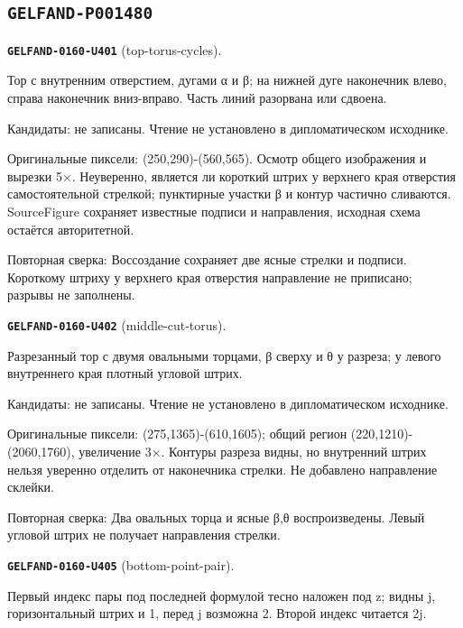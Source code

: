 \subsection*{\texttt{GELFAND-P001480}}
\par\noindent\leavevmode{}\label{GELFAND-0160-U401}\label{GELFAND-P001480:top-torus-cycles}\textbf{\texttt{GELFAND-0160-U401}} (top-torus-cycles).\nopagebreak[4]\par
Тор с внутренним отверстием, дугами α и β; на нижней дуге наконечник влево, справа наконечник вниз-вправо. Часть линий разорвана или сдвоена.\par
Кандидаты: не записаны. Чтение не установлено в дипломатическом исходнике.\par
Оригинальные пиксели: (250,290)-(560,565). Осмотр общего изображения и вырезки 5×. Неуверенно, является ли короткий штрих у верхнего края отверстия самостоятельной стрелкой; пунктирные участки β и контур частично сливаются. SourceFigure сохраняет известные подписи и направления, исходная схема остаётся авторитетной.\par
Повторная сверка: Воссоздание сохраняет две ясные стрелки и подписи. Короткому штриху у верхнего края отверстия направление не приписано; разрывы не заполнены.\par\medskip
\par\noindent\leavevmode{}\label{GELFAND-0160-U402}\label{GELFAND-P001480:middle-cut-torus}\textbf{\texttt{GELFAND-0160-U402}} (middle-cut-torus).\nopagebreak[4]\par
Разрезанный тор с двумя овальными торцами, β сверху и θ у разреза; у левого внутреннего края плотный угловой штрих.\par
Кандидаты: не записаны. Чтение не установлено в дипломатическом исходнике.\par
Оригинальные пиксели: (275,1365)-(610,1605); общий регион (220,1210)-(2060,1760), увеличение 3×. Контуры разреза видны, но внутренний штрих нельзя уверенно отделить от наконечника стрелки. Не добавлено направление склейки.\par
Повторная сверка: Два овальных торца и ясные β,θ воспроизведены. Левый угловой штрих не получает направления стрелки.\par\medskip
\par\noindent\leavevmode{}\label{GELFAND-0160-U405}\label{GELFAND-P001480:bottom-point-pair}\textbf{\texttt{GELFAND-0160-U405}} (bottom-point-pair).\nopagebreak[4]\par
Первый индекс пары под последней формулой тесно наложен под z; видны j, горизонтальный штрих и 1, перед j возможна 2. Второй индекс читается 2j.\par
